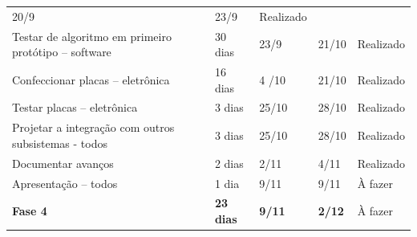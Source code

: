 \begin{table}[!htbp]
{\begin{tabular}{ l l l l l }
    \multicolumn{1}{p{1.650cm}|}{20/9} &
    \multicolumn{1}{p{1.550cm}|}{23/9} &
    \multicolumn{1}{p{2.000cm}|}{Realizado}
  \\  
  \cline{1-1}\cline{2-2}\cline{3-3}\cline{4-4}\cline{5-5}  
    \multicolumn{1}{|p{6.900cm}|}{Testar de algoritmo em primeiro protótipo – software} &
    \multicolumn{1}{p{1.817cm}|}{30 dias} &
    \multicolumn{1}{p{1.650cm}|}{23/9} &
    \multicolumn{1}{p{1.550cm}|}{21/10} &
    \multicolumn{1}{p{2.000cm}|}{Realizado}
  \\  
  \cline{1-1}\cline{2-2}\cline{3-3}\cline{4-4}\cline{5-5}  
    \multicolumn{1}{|p{6.900cm}|}{Confeccionar placas – eletrônica} &
    \multicolumn{1}{p{1.817cm}|}{16 dias} &
    \multicolumn{1}{p{1.650cm}|}{4 /10} &
    \multicolumn{1}{p{1.550cm}|}{21/10} &
    \multicolumn{1}{p{2.000cm}|}{Realizado}
  \\  
  \cline{1-1}\cline{2-2}\cline{3-3}\cline{4-4}\cline{5-5}  
    \multicolumn{1}{|p{6.900cm}|}{Testar placas – eletrônica} &
    \multicolumn{1}{p{1.817cm}|}{3 dias} &
    \multicolumn{1}{p{1.650cm}|}{25/10} &
    \multicolumn{1}{p{1.550cm}|}{28/10} &
    \multicolumn{1}{p{2.000cm}|}{Realizado}
  \\  
  \cline{1-1}\cline{2-2}\cline{3-3}\cline{4-4}\cline{5-5}  
    \multicolumn{1}{|p{6.900cm}|}{Projetar a integração com outros subsistemas - todos} &
    \multicolumn{1}{p{1.817cm}|}{3 dias} &
    \multicolumn{1}{p{1.650cm}|}{25/10} &
    \multicolumn{1}{p{1.550cm}|}{28/10} &
    \multicolumn{1}{p{2.000cm}|}{Realizado}
  \\  
  \cline{1-1}\cline{2-2}\cline{3-3}\cline{4-4}\cline{5-5}  
    \multicolumn{1}{|p{6.900cm}|}{Documentar avanços} &
    \multicolumn{1}{p{1.817cm}|}{2 dias} &
    \multicolumn{1}{p{1.650cm}|}{2/11} &
    \multicolumn{1}{p{1.550cm}|}{4/11} &
    \multicolumn{1}{p{2.000cm}|}{Realizado}
  \\  
  \cline{1-1}\cline{2-2}\cline{3-3}\cline{4-4}\cline{5-5}  
    \multicolumn{1}{|p{6.900cm}|}{Apresentação – todos} &
    \multicolumn{1}{p{1.817cm}|}{1 dia} &
    \multicolumn{1}{p{1.650cm}|}{9/11} &
    \multicolumn{1}{p{1.550cm}|}{9/11} &
    \multicolumn{1}{p{2.000cm}|}{À fazer}
  \\  
  \cline{1-1}\cline{2-2}\cline{3-3}\cline{4-4}\cline{5-5}  
    \multicolumn{1}{|p{6.900cm}|}{\textbf{Fase 4}} &
    \multicolumn{1}{p{1.817cm}|}{\textbf{23 dias}} &
    \multicolumn{1}{p{1.650cm}|}{\textbf{9/11}} &
    \multicolumn{1}{p{1.550cm}|}{\textbf{2/12}} &
    \multicolumn{1}{p{2.000cm}|}{À fazer}
  \\  

\end{tabular}}
\end{table}
